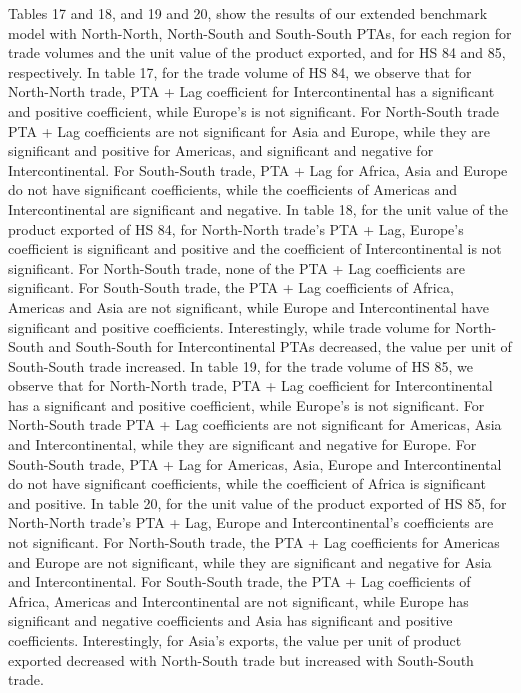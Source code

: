 Tables 17 and 18, and 19 and 20, show the results of our extended
benchmark model with North-North, North-South and South-South PTAs, for
each region for trade volumes and the unit value of the product
exported, and for HS 84 and 85, respectively. In table 17, for the trade
volume of HS 84, we observe that for North-North trade, PTA + Lag
coefficient for Intercontinental has a significant and positive
coefficient, while Europe's is not significant. For North-South trade
PTA + Lag coefficients are not significant for Asia and Europe, while
they are significant and positive for Americas, and significant and
negative for Intercontinental. For South-South trade, PTA + Lag for
Africa, Asia and Europe do not have significant coefficients, while the
coefficients of Americas and Intercontinental are significant and
negative. In table 18, for the unit value of the product exported of HS
84, for North-North trade's PTA + Lag, Europe's coefficient is
significant and positive and the coefficient of Intercontinental is not
significant. For North-South trade, none of the PTA + Lag coefficients
are significant. For South-South trade, the PTA + Lag coefficients of
Africa, Americas and Asia are not significant, while Europe and
Intercontinental have significant and positive coefficients.
Interestingly, while trade volume for North-South and South-South for
Intercontinental PTAs decreased, the value per unit of South-South trade
increased. In table 19, for the trade volume of HS 85, we observe that
for North-North trade, PTA + Lag coefficient for Intercontinental has a
significant and positive coefficient, while Europe's is not significant.
For North-South trade PTA + Lag coefficients are not significant for
Americas, Asia and Intercontinental, while they are significant and
negative for Europe. For South-South trade, PTA + Lag for Americas,
Asia, Europe and Intercontinental do not have significant coefficients,
while the coefficient of Africa is significant and positive. In table
20, for the unit value of the product exported of HS 85, for North-North
trade's PTA + Lag, Europe and Intercontinental's coefficients are not
significant. For North-South trade, the PTA + Lag coefficients for
Americas and Europe are not significant, while they are significant and
negative for Asia and Intercontinental. For South-South trade, the PTA +
Lag coefficients of Africa, Americas and Intercontinental are not
significant, while Europe has significant and negative coefficients and
Asia has significant and positive coefficients. Interestingly, for
Asia's exports, the value per unit of product exported decreased with
North-South trade but increased with South-South trade.

